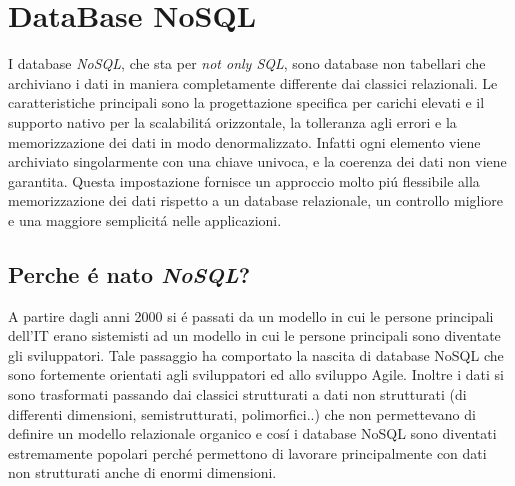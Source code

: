 \chapter{DataBase NoSQL}
I database \emph{NoSQL}, che sta per \emph{not only SQL}, sono database non tabellari che archiviano i dati
in maniera completamente differente dai classici relazionali.
Le caratteristiche principali sono la progettazione specifica per carichi elevati e il supporto nativo per la scalabilitá
orizzontale, la tolleranza agli errori e la memorizzazione dei dati in modo denormalizzato.
Infatti ogni elemento viene archiviato singolarmente con una chiave univoca, e la coerenza dei dati non viene garantita.
Questa impostazione fornisce un approccio molto piú flessibile alla memorizzazione dei dati rispetto a un database
relazionale, un controllo migliore e una maggiore semplicitá nelle applicazioni.

\section{Perche é nato \emph{NoSQL}?}
A partire dagli anni 2000 si é passati da un modello in cui le persone principali dell'IT erano sistemisti ad un modello
in cui le persone principali sono diventate gli sviluppatori. Tale passaggio ha comportato la nascita di database NoSQL
che sono fortemente orientati agli sviluppatori ed allo sviluppo Agile.
Inoltre i dati si sono trasformati passando dai classici strutturati a dati non strutturati (di differenti dimensioni,
semistrutturati, polimorfici..) che non permettevano di definire un modello relazionale organico e cosí i database NoSQL sono
diventati estremamente popolari perché permettono di lavorare principalmente con dati non strutturati anche di enormi
dimensioni.

